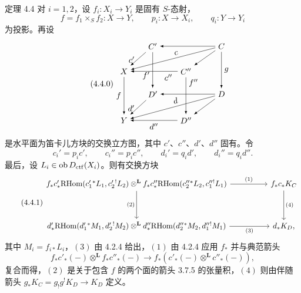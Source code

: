 \begin{statement}{定理 4.4}
对 $i=1,2$，设 $f_i:X_i\longrightarrow Y_i$ 是固有 $S$-态射，
\[
f=f_1\times_S f_2:X\longrightarrow Y,\qquad
p_i:X\longrightarrow X_i,\qquad q_i:Y\longrightarrow Y_i
\]
为投影。再设
\begin{equation}
\tag{4.4.0}
\begin{tikzpicture}[>=latex,baseline=(current bounding box.center),scale=0.98]
\node (Cp) at (0,2.1) {$C'$};
\node (C) at (3.0,2.1) {$C$};
\node (X) at (-1.25,1.0) {$X$};
\node (Cpp) at (1.45,1.0) {$C''$};
\node (Dp) at (0,0) {$D'$};
\node (D) at (3.0,0) {$D$};
\node (Y) at (-1.25,-1.15) {$Y$};
\node (Dpp) at (1.45,-1.15) {$D''$};
\draw[->] (C) -- (Cp);
\draw[->] (Cp) -- node[left,pos=.55] {$c'$} (X);
\draw[->] (C) -- node[above,sloped,pos=.45] {$c$} (X);
\draw[->] (C) -- (Cpp);
\draw[->] (Cpp) -- node[below,pos=.20] {$c''$} (X);
\draw[->] (Cp) -- node[left,pos=.65] {$f'$} (Dp);
\draw[->] (Cpp) -- node[right,pos=.15] {$f''$} (Dpp);
\draw[->] (C) -- node[right] {$g$} (D);
\draw[->] (X) -- node[left] {$f$} (Y);
\draw[->] (D) -- (Dp);
\draw[->] (Dp) -- node[left,pos=.55] {$d'$} (Y);
\draw[->] (D) -- node[above,sloped,pos=.45] {$d$} (Y);
\draw[->] (D) -- (Dpp);
\draw[->] (Dpp) -- node[below] {$d''$} (Y);
\end{tikzpicture}
\end{equation}
是水平面为笛卡儿方块的交换立方图，其中 $c'$、$c''$、$d'$、$d''$ 固有。令
\[
c_i'=p_i c',\qquad c_i''=p_i c'',\qquad d_i'=q_i d',\qquad d_i''=q_i d''.
\]
最后，设 $L_i\in\operatorname{ob} D_{\mathrm{ctf}}(X_i)$。则有交换方块
\begin{equation}
\tag{4.4.1}
\begin{tikzcd}[column sep=huge,row sep=huge]
f_*c'_*\RHom(c_1'{}^*L_1,c_2'{}^!L_2)\otimes^{\mathbf L}
f_*c''_*\RHom(c_2''{}^*L_2,c_1''{}^!L_1)
 \arrow[r,"(1)"] \arrow[d,"(2)"'] &
f_*c_*K_C \arrow[d,"(4)"] \\
d'_*\RHom(d_1'{}^*M_1,d_2'{}^!M_2)\otimes^{\mathbf L}
d''_*\RHom(d_2''{}^*M_2,d_1''{}^!M_1)
 \arrow[r,"(3)"'] &
d_*K_D ,
\end{tikzcd}
\end{equation}
其中 $M_i=f_{i*}L_i$，$(3)$ 由 4.2.4 给出，$(1)$ 由 4.2.4 应用 $f_*$ 并与典范箭头
\[
f_*c'_*(-)\otimes^{\mathbf L} f_*c''_*(-)\longrightarrow f_*(c'_*(-)\otimes^{\mathbf L}c''_*(-)),
\]
复合而得，$(2)$ 是关于包含 $f$ 的两个面的箭头 3.7.5 的张量积，$(4)$ 则由伴随箭头 $g_*K_C=g_!g^!K_D\longrightarrow K_D$ 定义。
\end{statement}


